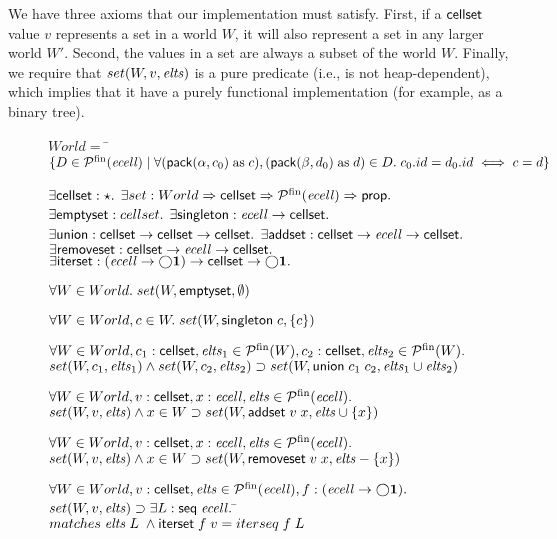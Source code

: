 We have three axioms that our implementation must satisfy. First, if a
$\mathsf{cellset}$ value $v$ represents a set in a world $W$, it will also
represent a set in any larger world $W'$. Second, the values in a set
are always a subset of the world $W$. Finally, we require that
$set(W,v,\mathit{elts})$ is a pure predicate (i.e., is not heap-dependent),
which implies that it have a purely functional implementation (for
example, as a binary tree). 

\begin{figure}
\begin{specification}
\nextline
$World = $ \nextline
\qquad\=$\{D \in \mathcal{P}^{\mathrm{fin}}(\mathit{ecell})\;|\;\forall (\mathsf{pack}({\alpha}, {c_0}) \; \mathrm{as}\; c),(\mathsf{pack}({\beta}, {d_0}) \;\mathrm{as}\; d) \in D.\;c_0.id = d_0.id \iff c = d\}$\nextline[1em]

$\exists \mathsf{cellset} : \star.$ \nextline
$\exists set : World \Rightarrow \mathsf{cellset} \Rightarrow \mathcal{P}^{\mathrm{fin}}(\mathit{ecell}) \Rightarrow \mathsf{prop}.$ \nextline
$\exists \mathsf{emptyset}    : cellset.$ \nextline
$\exists \mathsf{singleton}   : \mathit{ecell} \to \mathsf{cellset}.$ \nextline
$\exists \mathsf{union}      : \mathsf{cellset} \to \mathsf{cellset} \to \mathsf{cellset}.$ \nextline
$\exists \mathsf{addset}      : \mathsf{cellset} \to \mathit{ecell} \to \mathsf{cellset}.$ \nextline
$\exists \mathsf{removeset}   : \mathsf{cellset} \to \mathit{ecell} \to \mathsf{cellset}.$ \nextline
$\exists \mathsf{iterset}     : (\mathit{ecell} \to \bigcirc{\mathbf{1}}) \to \mathsf{cellset} \to \bigcirc{\mathbf{1}}.$\nextline[1em]

$\forall W \in World.\; set(W, \mathsf{emptyset}, \emptyset)$ \nextline[1em]

$\forall W \in World, c \in W.\; set(W, \mathsf{singleton}\;c, \{{c}\})$ \nextline[1em]

$\forall W \in World, c_1 : \mathsf{cellset}, \mathit{elts}_1 \in \mathcal{P}^{\mathrm{fin}}(W), c_2 : \mathsf{cellset}, \mathit{elts}_2 \in \mathcal{P}^{\mathrm{fin}}(W).$ \nextline
\>$set(W, c_1, \mathit{elts}_1) \land set(W, c_2, \mathit{elts}_2) \supset set(W, \mathsf{union}\;c_1\;c_2, \mathit{elts}_1 \cup \mathit{elts}_2)$ \nextline[1em]


$\forall W \in World, v : \mathsf{cellset}, x : \mathit{ecell}, \mathit{elts} \in \mathcal{P}^{\mathrm{fin}}(\mathit{ecell}).$ \nextline 
\> $set(W, v, \mathit{elts}) \land x \in W \supset set(W, \mathsf{addset}\;v\;x, \mathit{elts} \cup \{{x}\})$ \nextline[1em]


$\forall W \in World, v : \mathsf{cellset}, x : \mathit{ecell}, \mathit{elts} \in \mathcal{P}^{\mathrm{fin}}(\mathit{ecell}).$ \nextline 
\> $set(W, v, \mathit{elts}) \land x \in W \supset set(W, \mathsf{removeset}\;v\;x, \mathit{elts} - \{{x}\})$ \nextline[1em]


$\forall W \in World, v : \mathsf{cellset}, \mathit{elts} \in \mathcal{P}^{\mathrm{fin}}(\mathit{ecell}), 
         f : (\mathit{ecell} \to \bigcirc{\mathbf{1}}).$ \nextline 
\> $set(W, v, \mathit{elts}) \supset \exists L : \mathsf{seq}\;{\mathit{ecell}}.\;$\=$matches\;\mathit{elts}\;L\; \land \mathsf{iterset}\;f\;v = iterseq\;f\;L$ \nextline[1em]



\end{specification}
\end{figure}
